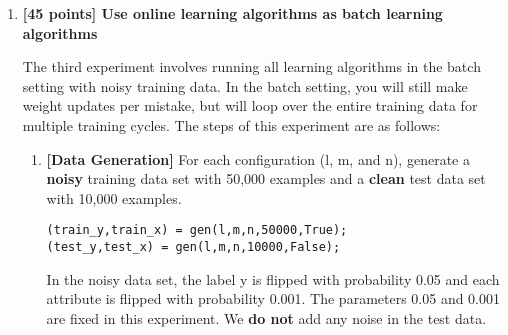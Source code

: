 \begin{enumerate}
Then, run each algorithm in the following fashion:
\begin{enumerate}
\item Present an example to the learning algorithm.
\item Update the hypothesis if needed; keep track of the number $W$ of
mistakes the algorithm makes.
\end{enumerate}
Keep doing this, until you get a sequence of $R$ examples on which the
algorithm makes no mistakes. Record $W$ at this point and stop.

For each algorithm, plot a curve of $W$ (the number of mistakes you
have made before the algorithm stops) as a function of $n$ on one
graph. Try this with convergence criterion $R = 1000$. It is possible
that it will take many examples to converge\footnote{If you are
running into memory problems, make sure you are not storing extraneous
information, like a cumulative count of errors for each example seen.}
; you can do it by cycling through the training data you
generated multiple times. If you are running into convergence problems
(e.g., no convergence after cycling through the data more than 10 times), try to
reduce $R$, but also think analytically about the choice of parameters
and initialization for the algorithms. Comment on the various
learning curves you see as part of your report.

\item {\bf [45 points] Use online learning algorithms as batch learning algorithms}

  The third experiment involves running all learning algorithms in the
  batch setting with noisy training data. In the batch setting, you will 
  still make weight updates per mistake, but will loop over the 
  entire training data for multiple training cycles. The steps of this experiment
  are as follows:

\begin{enumerate}
  \item {\bf [Data Generation]} For each configuration (l, m, and n),
  generate a {\bf noisy} training data set with 50,000 examples and a
  {\bf clean} test data set with 10,000 examples.
\begin{verbatim}
(train_y,train_x) = gen(l,m,n,50000,True);
(test_y,test_x) = gen(l,m,n,10000,False);
\end{verbatim}

In the noisy data set, the label y is flipped with probability 0.05
and each attribute is flipped with probability 0.001. The parameters
0.05 and 0.001 are fixed in this experiment. We {\bf do not} add any noise
in the test data.


\end{enumerate}
\end{enumerate}
